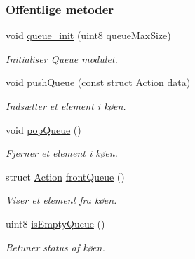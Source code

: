 \subsubsection*{Offentlige metoder}
\begin{DoxyCompactItemize}
\item 
void \hyperlink{class_queue_a4e0a3758d721506e7729f4d074a280ff}{queue\+\_\+init} (uint8 queue\+Max\+Size)
\begin{DoxyCompactList}\small\item\em Initialiser \hyperlink{class_queue}{Queue} modulet. \end{DoxyCompactList}\item 
void \hyperlink{class_queue_a0012fa831aa1529e5ed3a6610b733423}{push\+Queue} (const struct \hyperlink{queue_8h_df/d8c/struct_action}{Action} data)
\begin{DoxyCompactList}\small\item\em Indsætter et element i køen. \end{DoxyCompactList}\item 
void \hyperlink{class_queue_a9ecab9ecdedfc331aed9a0ae63ce193b}{pop\+Queue} ()
\begin{DoxyCompactList}\small\item\em Fjerner et element i køen. \end{DoxyCompactList}\item 
struct \hyperlink{queue_8h_df/d8c/struct_action}{Action} \hyperlink{class_queue_a49c50ba30a42033068d8d8e6a23c6ca1}{front\+Queue} ()
\begin{DoxyCompactList}\small\item\em Viser et element fra køen. \end{DoxyCompactList}\item 
uint8 \hyperlink{class_queue_aafb324c79731abdc228dbf94d86722a3}{is\+Empty\+Queue} ()
\begin{DoxyCompactList}\small\item\em Retuner status af køen. \end{DoxyCompactList}\end{DoxyCompactItemize}
